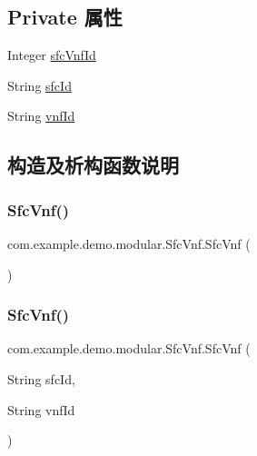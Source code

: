 \subsection*{Private 属性}
\begin{DoxyCompactItemize}
\item 
Integer \mbox{\hyperlink{classcom_1_1example_1_1demo_1_1modular_1_1_sfc_vnf_ada8fd49d169bb4d1f223b5a77be4a230}{sfc\+Vnf\+Id}}
\item 
String \mbox{\hyperlink{classcom_1_1example_1_1demo_1_1modular_1_1_sfc_vnf_adef4bb1d23bc85112f728d45f99be998}{sfc\+Id}}
\item 
String \mbox{\hyperlink{classcom_1_1example_1_1demo_1_1modular_1_1_sfc_vnf_a5220d16aa48e52d0b804a14309d79117}{vnf\+Id}}
\end{DoxyCompactItemize}


\subsection{构造及析构函数说明}
\mbox{\label{classcom_1_1example_1_1demo_1_1modular_1_1_sfc_vnf_a6142d12fc8fe040e067bb43d5181ac8a}} 
\subsubsection{\texorpdfstring{Sfc\+Vnf()}{SfcVnf()}\hspace{0.1cm}{\footnotesize\ttfamily [1/2]}}
{\footnotesize\ttfamily com.\+example.\+demo.\+modular.\+Sfc\+Vnf.\+Sfc\+Vnf (\begin{DoxyParamCaption}{ }\end{DoxyParamCaption})}

\mbox{\label{classcom_1_1example_1_1demo_1_1modular_1_1_sfc_vnf_aacc139a43e7e1a2e9a41a7f49fec0e65}} 
\subsubsection{\texorpdfstring{Sfc\+Vnf()}{SfcVnf()}\hspace{0.1cm}{\footnotesize\ttfamily [2/2]}}
{\footnotesize\ttfamily com.\+example.\+demo.\+modular.\+Sfc\+Vnf.\+Sfc\+Vnf (\begin{DoxyParamCaption}\item[{String}]{sfc\+Id,  }\item[{String}]{vnf\+Id }\end{DoxyParamCaption})}



